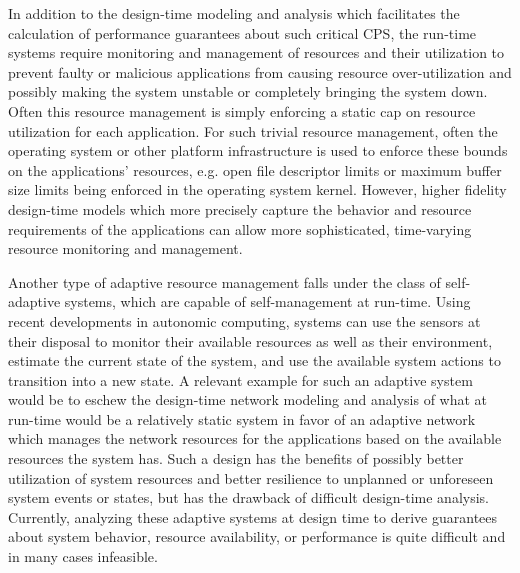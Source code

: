 In addition to the design-time modeling and analysis which facilitates
the calculation of performance guarantees about such critical CPS, the
run-time systems require monitoring and management of resources and
their utilization to prevent faulty or malicious applications from
causing resource over-utilization and possibly making the system
unstable or completely bringing the system down.  Often this resource
management is simply enforcing a static cap on resource utilization
for each application.  For such trivial resource management, often the
operating system or other platform infrastructure is used to enforce
these bounds on the applications' resources, e.g. open file descriptor
limits or maximum buffer size limits being enforced in the operating
system kernel.  However, higher fidelity design-time models which more
precisely capture the behavior and resource requirements of the
applications can allow more sophisticated, time-varying resource
monitoring and management.

Another type of adaptive resource management falls under the class of
self-adaptive systems, which are capable of self-management at
run-time.  Using recent developments in autonomic computing, systems
can use the sensors at their disposal to monitor their available
resources as well as their environment, estimate the current state of
the system, and use the available system actions to transition into a
new state\cite{ibmAutonomicComputing2003}.  A relevant example for
such an adaptive system would be to eschew the design-time network
modeling and analysis of what at run-time would be a relatively static
system in favor of an adaptive network which manages the network
resources for the applications based on the available resources the
system has.  Such a design has the benefits of possibly better
utilization of system resources and better resilience to unplanned or
unforeseen system events or states, but has the drawback of difficult
design-time analysis.  Currently, analyzing these adaptive systems at
design time to derive guarantees about system behavior, resource
availability, or performance is quite difficult and in many cases
infeasible.

